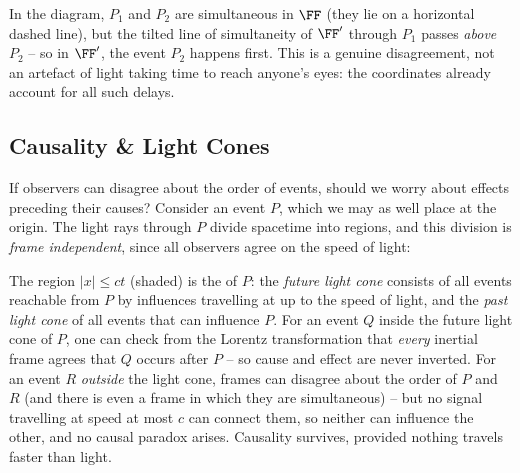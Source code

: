 In the diagram, $P_1$ and $P_2$ are simultaneous in $\FF$ (they lie on a horizontal dashed line), but the tilted line of simultaneity of $\FF'$ through $P_1$ passes \emph{above} $P_2$ -- so in $\FF'$, the event $P_2$ happens first. This is a genuine disagreement, not an artefact of light taking time to reach anyone's eyes: the coordinates already account for all such delays.

\subsection{Causality \& Light Cones}

If observers can disagree about the order of events, should we worry about effects preceding their causes? Consider an event $P$, which we may as well place at the origin. The light rays through $P$ divide spacetime into regions, and this division is \emph{frame independent}, since all observers agree on the speed of light:

\begin{center}
\end{center}

The region $|x| \leq ct$ (shaded) is the  of $P$: the \emph{future light cone} consists of all events reachable from $P$ by influences travelling at up to the speed of light, and the \emph{past light cone} of all events that can influence $P$. For an event $Q$ inside the future light cone of $P$, one can check from the Lorentz transformation that \emph{every} inertial frame agrees that $Q$ occurs after $P$ -- so cause and effect are never inverted. For an event $R$ \emph{outside} the light cone, frames can disagree about the order of $P$ and $R$ (and there is even a frame in which they are simultaneous) -- but no signal travelling at speed at most $c$ can connect them, so neither can influence the other, and no causal paradox arises. Causality survives, provided nothing travels faster than light.

